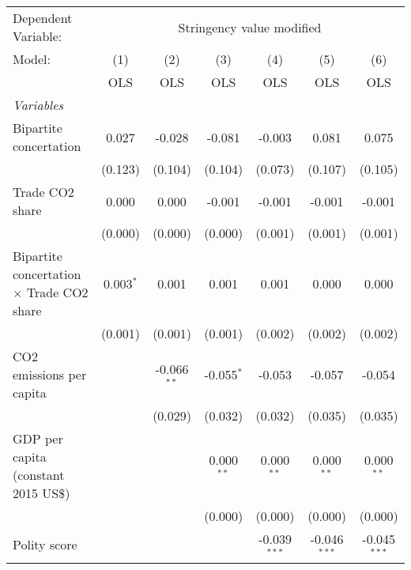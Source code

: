 
\begingroup
\centering
\begin{tabular}{lcccccc}
   \toprule
   Dependent Variable: & \multicolumn{6}{c}{Stringency value modified}\\
   Model:                                           & (1)         & (2)           & (3)          & (4)            & (5)            & (6)\\  
                                                    &  OLS        & OLS           & OLS          & OLS            & OLS            & OLS\\  
   \midrule
   \emph{Variables}\\
   Bipartite concertation                           & 0.027       & -0.028        & -0.081       & -0.003         & 0.081          & 0.075\\   
                                                    & (0.123)     & (0.104)       & (0.104)      & (0.073)        & (0.107)        & (0.105)\\   
   Trade CO2 share                                  & 0.000       & 0.000         & -0.001       & -0.001         & -0.001         & -0.001\\   
                                                    & (0.000)     & (0.000)       & (0.000)      & (0.001)        & (0.001)        & (0.001)\\   
   Bipartite concertation $\times$ Trade CO2 share  & 0.003$^{*}$ & 0.001         & 0.001        & 0.001          & 0.000          & 0.000\\   
                                                    & (0.001)     & (0.001)       & (0.001)      & (0.002)        & (0.002)        & (0.002)\\   
   CO2 emissions per capita                         &             & -0.066$^{**}$ & -0.055$^{*}$ & -0.053         & -0.057         & -0.054\\   
                                                    &             & (0.029)       & (0.032)      & (0.032)        & (0.035)        & (0.035)\\   
   GDP per capita (constant 2015 US\$)              &             &               & 0.000$^{**}$ & 0.000$^{**}$   & 0.000$^{**}$   & 0.000$^{**}$\\   
                                                    &             &               & (0.000)      & (0.000)        & (0.000)        & (0.000)\\   
   Polity score                                     &             &               &              & -0.039$^{***}$ & -0.046$^{***}$ & -0.045$^{***}$\\   

\end{tabular}
